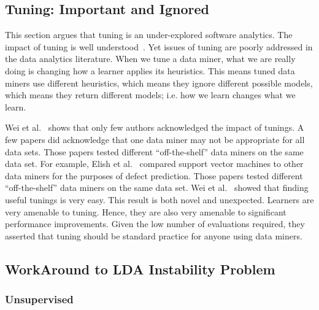 \documentclass[10pt,conference]{IEEEtran}
\theoremstyle{break}
\begin{document}
\subsection{Tuning: Important and Ignored}
\label{sect: tuning}

This section argues that tuning is an under-explored software analytics. The impact of tuning is well understood~\cite{bergstra2012random}. Yet issues of tuning are poorly addressed in the data analytics literature. When we tune a data miner, what we are really doing is changing how a learner applies its heuristics. This means tuned data miners use different heuristics, which means they ignore different possible models, which means they return different models; i.e. how we learn changes what we learn.

Wei et al.~\cite{fu2016tuning} shows that only few authors acknowledged the impact of tunings. A few papers did acknowledge that one data miner may not be appropriate for all data sets. Those papers tested different “off-the-shelf” data miners on the same data set. For example, Elish et al.~\cite{elish2008predicting} compared support vector machines to other data miners for the purposes of defect prediction. Those papers tested different “off-the-shelf” data miners on the same data set. Wei et al.~\cite{fu2016tuning} showed that finding useful tunings is very easy. This result is both novel and unexpected. Learners are very amenable to tuning. Hence, they are also very amenable to significant performance improvements. Given the low number of evaluations required, they asserted that tuning should be standard practice for anyone using data miners.

\subsection{WorkAround to LDA Instability Problem}
\label{sect: solutions}

\subsubsection{\textbf{Unsupervised}}
\hfill

\noindent{}
\end{document}
